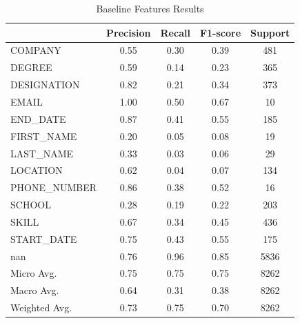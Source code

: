   \begin{table}[H]
    \centering
    \begin{tabular}{|l|c|c|c|c|}
         \hline
             & Precision & Recall & F1-score & Support \\
         \hline
     COMPANY & 0.55 & 0.30 & 0.39 &  481 \\
      DEGREE & 0.59 & 0.14 & 0.23 &  365 \\
 DESIGNATION & 0.82 & 0.21 & 0.34 &  373 \\
       EMAIL & 1.00 & 0.50 & 0.67 &   10 \\
    END\_DATE & 0.87 & 0.41 & 0.55 &  185 \\
  FIRST\_NAME & 0.20 & 0.05 & 0.08 &   19 \\
   LAST\_NAME & 0.33 & 0.03 & 0.06 &   29 \\
    LOCATION & 0.62 & 0.04 & 0.07 &  134 \\
PHONE\_NUMBER & 0.86 & 0.38 & 0.52 &   16 \\
      SCHOOL & 0.28 & 0.19 & 0.22 &  203 \\
       SKILL & 0.67 & 0.34 & 0.45 &  436 \\
  START\_DATE & 0.75 & 0.43 & 0.55 &  175 \\
         nan & 0.76 & 0.96 & 0.85 & 5836 \\
         \hline

   Micro Avg. & 0.75 & 0.75 & 0.75 & 8262 \\
   Macro Avg. & 0.64 & 0.31 & 0.38 & 8262 \\
Weighted Avg. & 0.73 & 0.75 & 0.70 & 8262 \\
         \hline
    \end{tabular}
    \caption{Baseline Features Results}
    \label{table:4}
  \end{table}

